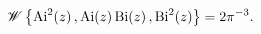 \[\mathop{\mathscr{W}\/}\nolimits\left\{{\mathop{\mathrm{Ai}\/}\nolimits^{2}}\!%
\left(z\right),\mathop{\mathrm{Ai}\/}\nolimits\!\left(z\right)\mathop{\mathrm{%
Bi}\/}\nolimits\!\left(z\right),{\mathop{\mathrm{Bi}\/}\nolimits^{2}}\!\left(z%
\right)\right\}=2\pi^{-3}.\]